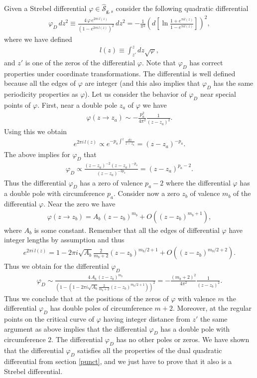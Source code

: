 \documentclass[11pt]{JHEP3}
\def\be{\begin{eqnarray}}
\def\ee{\end{eqnarray}}
\def\vf{\varphi}
\def\gg{\mathsf g }
\begin{document}
Given a Strebel differential $\vf\in \hat{\mathcal S}_{\gg,s}$ consider the following quadratic differential
\be\label{defdual}
\vf_D\,dz^2\equiv \frac{4\,\vf\,e^{2\pi i\,l(z)}}{\left(1-e^{2\pi i\,l(z)}\right)^2}\,dz^2
=-\frac{1}{\pi^2}\left(d\left[\ln\frac{1+e^{\pi i l(z)}}{1-e^{\pi i l(z)}}\right]\right)^2,
\ee where we have defined 
\be
l(z)\equiv \int_{z'}^{z}dz\sqrt{\vf},%
\ee and $z'$ is one of the zeros of the differential $\vf$.  Note that $\vf_D$ has correct
properties under coordinate transformations. The differential is well defined because all the edges
of $\vf$ are integer (and this also implies that  $\vf_D$ has the same periodicity
properties as $\vf$). Let us consider the behavior of $\vf_D$ near special
points of $\vf$. First, near a double pole $z_a$ of $\vf$ we have
\be
\vf(z\to z_a)\sim-\frac{p_a^2}{4\pi^2}\frac{1}{(z-z_a)^2}.
\ee Using this we obtain
\be
e^{2\pi i\,l(z)}\propto e^{- p_a\int^{z}\frac{dz}{z-z_a}}=(z-z_a)^{- p_a}.
\ee The above implies for $\vf_D$ that
\be
\vf_D\propto \frac{(z-z_a)^{-2}(z-z_a)^{-p_a}}{(z-z_a)^{-2p_a}}=(z-z_a)^{p_a-2}.
\ee Thus the differential $\vf_D$ has a zero of valence $p_a-2$ where the differential
$\vf$ has a double pole with circumference $p_a$. Consider now a zero $z_b$ of valence $m_b$
of the differential $\vf$. Near the zero we have
\be
\vf(z\to z_b)=A_b\,(z-z_b)^{m_b}+O((z-z_b)^{m_b+1}),
\ee where $A_b$ is some constant. Remember that all the edges of differential $\vf$ have
integer lengths by assumption and thus
\be
e^{2\pi i\,l(z)}=1-2\pi i\sqrt{A_b}\frac{2}{m_b+2}(z-z_b)^{m_b/2+1}
+O((z-z_b)^{m_b/2+2}).
\ee Thus we obtain for the differential $\vf_D$
\be
\vf_D\sim\frac{4\,A_b\,(z-z_b)^{m_b}}{\left(1-(1-2\pi i\sqrt{A_b}\frac{2}{m_b+2}(z-z_b)^{m_b/2+1})\right)^2}=-\frac{(m_b+2)^2}{4\pi^2}\frac{1}{(z-z_b)^2}.
\ee Thus we conclude that at the positions of the zeros of $\vf$ with
valence $m$ the differential $\vf_D$ has double poles of circumference $m+2$. Moreover,
at the regular points on the critical curve of $\vf$ having integer distance from $z'$ the 
same argument as above implies that the differential $\vf_D$ has a double pole with
circumference $2$. The differential $\vf_D$ has no other poles or zeros. We have shown that the differential $\vf_D$ satisfies all the properties
of the dual quadratic differential from section \ref{punct}, and we just have to prove that it
also is a Strebel differential.
\end{document}
